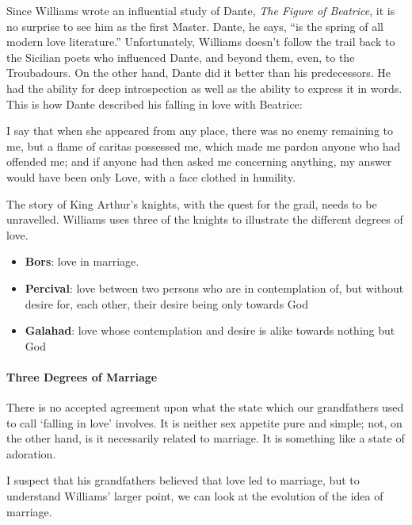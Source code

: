 Since Williams wrote an influential study of Dante, \emph{The Figure of Beatrice}, it is no surprise to see him as the first Master. Dante, he says, “is the spring of all modern love literature.” Unfortunately, Williams doesn't follow the trail back to the Sicilian poets who influenced Dante, and beyond them, even, to the Troubadours. On the other hand, Dante did it better than his predecessors. He had the ability for deep introspection as well as the ability to express it in words. This is how Dante described his falling in love with Beatrice:

\begin{quotex}
I say that when she appeared from any place, there was no enemy remaining to me, but a flame of caritas possessed me, which made me pardon anyone who had offended me; and if anyone had then asked me concerning anything, my answer would have been only Love, with a face clothed in humility. 

\end{quotex}
The story of King Arthur's knights, with the quest for the grail, needs to be unravelled. Williams uses three of the knights to illustrate the different degrees of love.

\begin{itemize}
\item \textbf{Bors}: love in marriage. 
\item \textbf{Percival}: love between two persons who are in contemplation of, but without desire for, each other, their desire being only towards God 
\item \textbf{Galahad}: love whose contemplation and desire is alike towards nothing but God 
\end{itemize}
\paragraph{Three Degrees of Marriage}
\begin{quotex}
There is no accepted agreement upon what the state which our grandfathers used to call `falling in love' involves. It is neither sex appetite pure and simple; not, on the other hand, is it necessarily related to marriage. It is something like a state of adoration. 

\end{quotex}
I suspect that his grandfathers believed that love led to marriage, but to understand Williams' larger point, we can look at the evolution of the idea of marriage.

